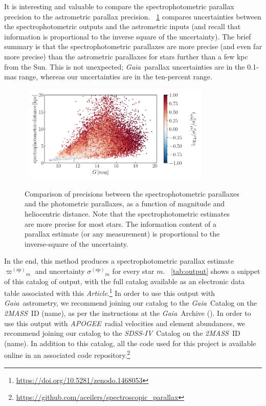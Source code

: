 \documentclass[modern]{aastex62}
\newcommand{\documentname}{\textsl{Article}}
\newcommand{\acronym}[1]{{\small{#1}}}
\newcommand{\project}[1]{\textsl{#1}}
\newcommand{\apogee}{\project{\acronym{APOGEE}}}
\newcommand{\gaia}{\project{Gaia}}
\newcommand{\zmass}{\project{\acronym{2MASS}}}
\newcommand{\sdssiv}{\project{\acronym{SDSS-IV}}}
\newcommand{\sparallax}{{\varpi^{(\mathrm{sp})}}}
\newcommand{\ssigma}{{\sigma^{(\mathrm{sp})}}}
\begin{document}
It is interesting and valuable to compare the spectrophotometric parallax precision to
the astrometric parallax precision.
\figurename~\ref{fig:precision} compares uncertainties between the spectrophotometric
outputs and the astrometric inputs
(and recall that information is proportional to the inverse square of the uncertainty).
The brief summary is that the spectrophotometric parallaxes are more precise (and even
far more precise) than the astrometric parallaxes for stars further than a few kpc from
the Sun.
This is not unexpected; \gaia\ parallax uncertainties are in the 0.1-mas range, whereas
our uncertainties are in the ten-percent range.
\begin{figure}
\centering
~\hfill\includegraphics[width=0.8\textwidth]{./precision.pdf}\hfill~
\caption{Comparison of precisions between the spectrophotometric parallaxes and
the photometric parallaxes, as a function of magnitude and heliocentric distance.
Note that the spectrophotometric estimates are more precise for most stars.
The information content of a parallax estimate (or any measurement)
is proportional to the inverse-square of the uncertainty.\label{fig:precision}}
\end{figure}

In the end, this method produces a spectrophotometric parallax estimate $\sparallax_m$
and uncertainty $\ssigma_m$ for every star $m$.
\tablename~\ref{tab:output} shows a snippet of this catalog of output, with the full catalog available
as an electronic data table associated with this \documentname.\footnote{\url{https://doi.org/10.5281/zenodo.1468053}}
In order to use this output with \gaia\ astrometry, we recommend joining our catalog to the
\gaia\ Catalog on the \zmass\ ID (name), as per the instructions at the \gaia\ Archive (\citealt{gaiaarchive}).
In order to use this output with \apogee\ radial velocities and element abundances, we recommend
joining our catalog to the \sdssiv\ Catalog on the \zmass\ ID (name).
In addition to this catalog, all the code used for this project is available online in an associated
code repository.\footnote{\url{https://github.com/aceilers/spectroscopic_parallax}}
\end{document}
